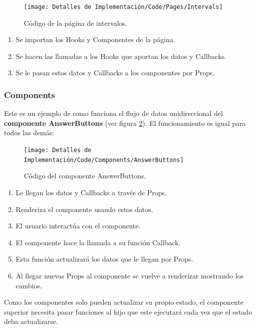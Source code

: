 \documentclass[12pt,twoside,titlepage]{report}
\begin{document}
\begin{figure}[H]
    \centering
    \texttt{[image: Detalles de Implementación/Code/Pages/Intervals]}
    \caption{Código de la página de intervalos.}
    \label{fig:IntervalsPage}
\end{figure}


\begin{enumerate}
    \item  Se importan los Hooks y Componentes de la página.
    \item  Se hacen las llamadas a los Hooks que aportan los datos y Callbacks.
    \item  Se le pasan estos datos y Callbacks a los componentes por Props.
\end{enumerate}


\subsubsection{Components}

Este es un ejemplo de como funciona el flujo de datos unidireccional del \textbf{componente AnswerButtons} (ver figura \ref{fig:AnswerButtons}). El funcionamiento es igual para todos las demás: 

\begin{figure}[H]
    \centering
    \texttt{[image: Detalles de Implementación/Code/Components/AnswerButtons]}
    \caption{Código del componente AnswerButtons.}
    \label{fig:AnswerButtons}
\end{figure}

\begin{enumerate}
    \item Le llegan los datos y Callbacks a través de Props.
    \item Renderiza el componente usando estos datos.
    \item El usuario interactúa con el componente.
    \item El componente hace la llamada a su función Callback.
    \item Esta función actualizará los datos que le llegan por Props.
    \item Al llegar nuevas Props al componente se vuelve a renderizar mostrando los cambios.
\end{enumerate}

Como los componentes solo pueden actualizar su propio estado, el componente superior necesita pasar funciones al hijo que este ejecutará cada vez que el estado deba actualizarse.
\end{document}
